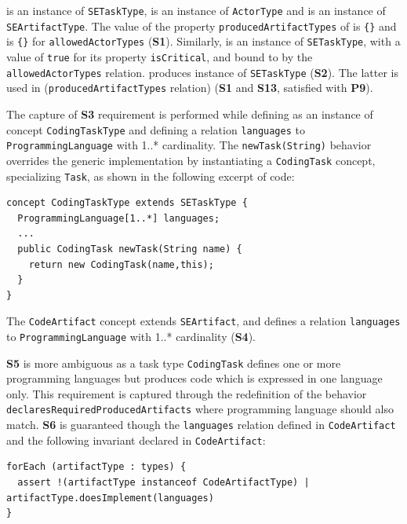 
 is an instance of \texttt{SETaskType},
 is an instance of \texttt{ActorType} and  is an instance of \texttt{SEArtifactType}. The value of the
property \texttt{producedArtifactTypes} of  is
\texttt{\{}\texttt{\}} and is
\texttt{\{}\texttt{\}} for \texttt{allowedActorTypes}
(\textbf{S1}). Similarly,  is an instance of
\texttt{SETaskType}, with a value of \texttt{true} for its property
\texttt{isCritical}, and bound to  by the
\texttt{allowedActorTypes} relation.  produces
 instance of \texttt{SETaskType} (\textbf{S2}). The latter is
used in  (\texttt{producedArtifactTypes} relation)
(\textbf{S1} and \textbf{S13}, satisfied with \textbf{P9}).

The capture of \textbf{S3} requirement is performed while defining
 as an instance of concept \texttt{CodingTaskType} and defining a
relation \texttt{languages} to \texttt{ProgrammingLanguage} with 1..*
cardinality.  The \texttt{newTask(String)} behavior overrides the generic
implementation by instantiating a \texttt{CodingTask} concept, specializing
\texttt{Task}, as shown in the following excerpt of \FML code:

\begin{lstlisting}
concept CodingTaskType extends SETaskType {
  ProgrammingLanguage[1..*] languages;
  ...
  public CodingTask newTask(String name) {
    return new CodingTask(name,this);
  }
}
\end{lstlisting}

The \texttt{CodeArtifact} concept extends \texttt{SEArtifact}, and defines a
relation \texttt{languages} to \texttt{ProgrammingLanguage} with 1..*
cardinality (\textbf{S4}).

\textbf{S5} is more ambiguous as a task type \texttt{CodingTask} defines one or
more programming languages but produces code which is expressed in one language
only. This requirement is captured through the redefinition of the behavior
\texttt{declaresRequiredProducedArtifacts} where programming language should
also match.  \textbf{S6} is guaranteed though the \texttt{languages} relation
defined in \texttt{CodeArtifact} and the following invariant declared in
\texttt{CodeArtifact}:
\begin{lstlisting}
forEach (artifactType : types) {
  assert !(artifactType instanceof CodeArtifactType) | artifactType.doesImplement(languages)
}
\end{lstlisting}

